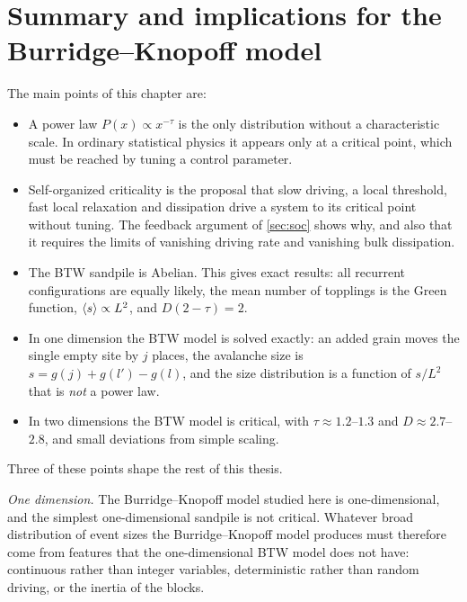 \section{Summary and implications for the Burridge--Knopoff model}
\label{sec:soc-implications}

The main points of this chapter are:
\begin{itemize}
  \item A power law $P(x)\propto x^{-\tau}$ is the only distribution without a characteristic scale. In ordinary statistical physics it appears
    only at a critical point, which must be reached by tuning a control parameter.
  \item Self-organized criticality is the proposal that slow driving, a local threshold, fast local relaxation and dissipation drive a system to
    its critical point without tuning. The feedback argument of \cref{sec:soc} shows why, and also that it requires the limits of vanishing
    driving rate and vanishing bulk dissipation.
  \item The BTW sandpile is Abelian. This gives exact results: all recurrent configurations are equally likely, the mean number of topplings is
    the Green function, $\left\langle s \right\rangle\propto L^2$, and $D(2-\tau)=2$.
  \item In one dimension the BTW model is solved exactly: an added grain moves the single empty site by $j$ places, the avalanche size is
    $s = g(j) + g(l') - g(l)$, and the size distribution is a function of $s/L^2$ that is \emph{not} a power law.
  \item In two dimensions the BTW model is critical, with $\tau\approx1.2$--$1.3$ and $D\approx2.7$--$2.8$, and small deviations from simple
    scaling.
\end{itemize}

Three of these points shape the rest of this thesis.

\emph{One dimension.} The Burridge--Knopoff model studied here is one-dimensional, and the simplest one-dimensional sandpile is not
critical. Whatever broad distribution of event sizes the Burridge--Knopoff model produces must therefore come from features that the
one-dimensional BTW model does not have: continuous rather than integer variables, deterministic rather than random driving, or the inertia of
the blocks.

